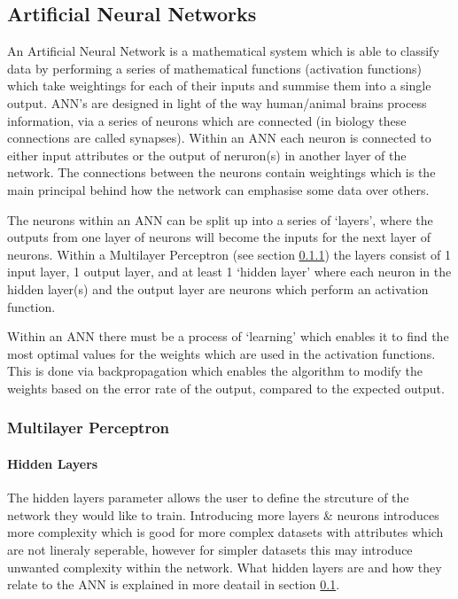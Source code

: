 \documentclass[12pt]{article}
\begin{document}
  \subsection{Artificial Neural Networks} \label{ann}
    An Artificial Neural Network is a mathematical system which is able to classify data by performing a series of mathematical functions (activation functions) which take weightings for each of their inputs and summise them into a single output. ANN's are designed in light of the way human/animal brains process information, via a series of neurons which are connected (in biology these connections are called synapses). Within an ANN each neuron is connected to either input attributes or the output of neruron(s) in another layer of the network. The connections between the neurons contain weightings which is the main principal behind how the network can emphasise some data over others.

    The neurons within an ANN can be split up into a series of ‘layers’, where the outputs from one layer of neurons will become the inputs for the next layer of neurons. Within a Multilayer Perceptron (see section \ref{mlp}) the layers consist of 1 input layer, 1 output layer, and at least 1 ‘hidden layer’ where each neuron in the hidden layer(s) and the output layer are neurons which perform an activation function.

    Within an ANN there must be a process of ‘learning’ which enables it to find the most optimal values for the weights which are used in the activation functions. This is done via backpropagation which enables the algorithm to modify the weights based on the error rate of the output, compared to the expected output.


      \subsubsection{Multilayer Perceptron} \label{mlp}
        \citep{minsky2017perceptrons}
        \paragraph{Hidden Layers}
          The hidden layers parameter allows the user to define the strcuture of the network they would like to train. Introducing more layers \& neurons introduces more complexity which is good for more complex datasets with attributes which are not lineraly seperable, however for simpler datasets this may introduce unwanted complexity within the network. What hidden layers are and how they relate to the ANN is explained in more deatail in section \ref{ann}.
\end{document}
